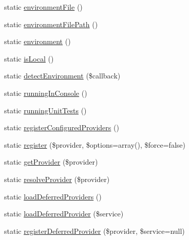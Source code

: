 \begin{DoxyCompactItemize}
\item 
static \mbox{\hyperlink{class_illuminate_1_1_support_1_1_facades_1_1_app_a8e9f268a821fcc7aa3dcab483cb187f3}{environment\+File}} ()
\item 
static \mbox{\hyperlink{class_illuminate_1_1_support_1_1_facades_1_1_app_a9c16c89deae92c08b4e5d279c1a15ce8}{environment\+File\+Path}} ()
\item 
static \mbox{\hyperlink{class_illuminate_1_1_support_1_1_facades_1_1_app_a53c0fed127157d6e0bef9fbeb259f348}{environment}} ()
\item 
static \mbox{\hyperlink{class_illuminate_1_1_support_1_1_facades_1_1_app_af9c91947f215d034daffd62a0ce9567f}{is\+Local}} ()
\item 
static \mbox{\hyperlink{class_illuminate_1_1_support_1_1_facades_1_1_app_aeb4034f4059f16bcc57773dd9acfa0d8}{detect\+Environment}} (\$callback)
\item 
static \mbox{\hyperlink{class_illuminate_1_1_support_1_1_facades_1_1_app_a476511ac80c67bc70dc76a1042a6e865}{running\+In\+Console}} ()
\item 
static \mbox{\hyperlink{class_illuminate_1_1_support_1_1_facades_1_1_app_a446de3e653e69d73e1fb3472b461c62e}{running\+Unit\+Tests}} ()
\item 
static \mbox{\hyperlink{class_illuminate_1_1_support_1_1_facades_1_1_app_a710f47568d2719e075faa6a4c82efc9b}{register\+Configured\+Providers}} ()
\item 
static \mbox{\hyperlink{class_illuminate_1_1_support_1_1_facades_1_1_app_ac2e4bf09a742bb48073523175bd8af49}{register}} (\$provider, \$options=array(), \$force=false)
\item 
static \mbox{\hyperlink{class_illuminate_1_1_support_1_1_facades_1_1_app_ab2b9e7c49809a4eb07a43851556bb5c9}{get\+Provider}} (\$provider)
\item 
static \mbox{\hyperlink{class_illuminate_1_1_support_1_1_facades_1_1_app_ae97865b3b6812e19ccf40260ab4e7f42}{resolve\+Provider}} (\$provider)
\item 
static \mbox{\hyperlink{class_illuminate_1_1_support_1_1_facades_1_1_app_a159a31f00393c2604cf66d77b9e9f3a4}{load\+Deferred\+Providers}} ()
\item 
static \mbox{\hyperlink{class_illuminate_1_1_support_1_1_facades_1_1_app_a545876969ac4dc8564e16971a056994a}{load\+Deferred\+Provider}} (\$service)
\item 
static \mbox{\hyperlink{class_illuminate_1_1_support_1_1_facades_1_1_app_a889b60d8f2bfb4727bf4b79e640041ec}{register\+Deferred\+Provider}} (\$provider, \$service=null)

\end{DoxyCompactItemize}
